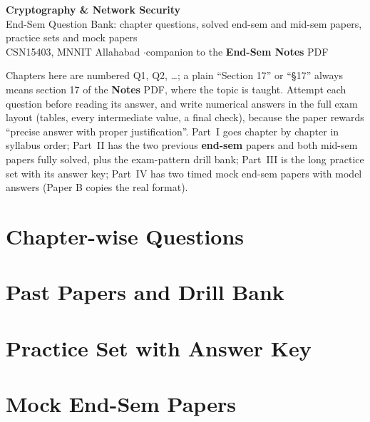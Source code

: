 \documentclass[10pt,a4paper]{article}
\begin{document}
\begin{center}
{\LARGE\bfseries Cryptography \& Network Security}\\[3pt]
{\large End-Sem Question Bank: chapter questions, solved end-sem and mid-sem papers, practice sets and mock papers}\\[2pt]
{\small CSN15403, MNNIT Allahabad \quad$\cdot$\quad companion to the \textbf{End-Sem Notes} PDF}
\end{center}

\begin{keybox}[title=How to use this book]
Chapters here are numbered Q1, Q2, \dots; a plain ``Section 17'' or ``\S17'' always means section 17 of the \textbf{Notes} PDF, where the topic is taught.
Attempt each question before reading its answer, and write numerical answers in the full exam layout (tables, every intermediate value, a final check), because the paper rewards ``precise answer with proper justification''.
Part~I goes chapter by chapter in syllabus order; Part~II has the two previous \textbf{end-sem} papers and both mid-sem papers fully solved, plus the exam-pattern drill bank; Part~III is the long practice set with its answer key; Part~IV has two timed mock end-sem papers with model answers (Paper B copies the real format).
\end{keybox}
{\small\tableofcontents}

\part{Chapter-wise Questions}






















\part{Past Papers and Drill Bank}




\part{Practice Set with Answer Key}


\part{Mock End-Sem Papers}

\end{document}
